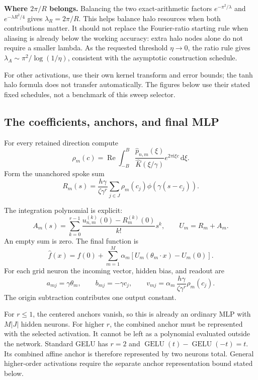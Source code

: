 \documentclass[11pt,letterpaper]{article}
\newcommand{\dd}{\,\mathrm d}
\newcommand{\ii}{\mathrm i}
\newcommand{\GELU}{\operatorname{GELU}}
\theoremstyle{definition}
\theoremstyle{remark}
\begin{document}
\textbf{Where \(2\pi/R\) belongs.} Balancing the two exact-arithmetic factors
\(e^{-\pi^2/\lambda}\) and \(e^{-\lambda R^2/4}\) gives \(\lambda_R=2\pi/R\).
This helps balance halo resources when both contributions matter. It should
not replace the Fourier-ratio starting rule when aliasing is already below
the working accuracy: extra halo nodes alone do not require a smaller lambda.
As the requested threshold \(\eta\to0\), the ratio rule gives
\(\lambda_A\sim\pi^2/\log(1/\eta)\), consistent with the asymptotic
construction schedule.

For other activations, use their own kernel transform and error bounds;
the tanh halo formula does not transfer automatically. The figures below
use their stated fixed schedules, not a benchmark of this sweep selector.

\subsection{The coefficients, anchors, and final MLP}
For every retained direction compute
\begin{equation}\label{eq:density}
 \rho_m(c)=\operatorname{Re}\int_{-B}^{B}
       \frac{\widehat p_{n,m}(\xi)}{\widehat K(\xi/\gamma)}
                       e^{2\pi\ii\xi c}\dd\xi.
\end{equation}
Form the unanchored spoke sum
\[
 R_m(s)=\frac{h\gamma}{\zeta\gamma^r}
             \sum_{j\in J}\rho_m(c_j)\phi(\gamma(s-c_j)).
\]

The integration polynomial is explicit:
\[
 A_m(s)=\sum_{k=0}^{r-1}
       \frac{u_{n,m}^{(k)}(0)-R_m^{(k)}(0)}{k!}s^k,\qquad
 U_m=R_m+A_m.
\]
An empty sum is zero. The final function is
\begin{equation}\label{eq:network}
 \widehat f(x)=f(0)+\sum_{m=1}^{M}\alpha_m
                     [U_m(\theta_m\cdot x)-U_m(0)].
\end{equation}
For each grid neuron the incoming vector, hidden bias, and readout are
\[
 a_{mj}=\gamma\theta_m,\qquad b_{mj}=-\gamma c_j,\qquad
 v_{mj}=\alpha_m\,\frac{h\gamma}{\zeta\gamma^r}\rho_m(c_j).
\]
The origin subtraction contributes one output constant.

For \(r\le1\), the centered anchors vanish, so this is already an ordinary
MLP with \(M|J|\) hidden neurons. For higher \(r\), the combined anchor must be
represented with the selected activation. It cannot be left as a polynomial
evaluated outside the network. Standard GELU has \(r=2\) and
\(\GELU(t)-\GELU(-t)=t\). Its combined affine anchor is therefore represented
by two neurons total. General higher-order activations require the separate
anchor representation bound stated below.
\end{document}

